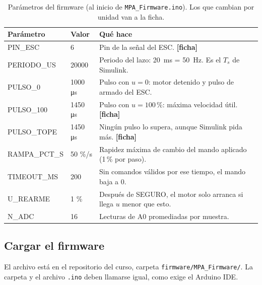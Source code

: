 \documentclass[11pt,letterpaper]{article}
\newcommand{\ficha}{\textcolor{verdeOK}{\textbf{[ficha]}}}  %
\begin{document}
\begin{table}[H]\centering\small
\caption{Parámetros del firmware (al inicio de \texttt{MPA\_Firmware.ino}). Los que cambian por unidad van a la ficha.}\label{tab:parametros}
\begin{tabularx}{\linewidth}{@{}>{\ttfamily}l l >{\raggedright\arraybackslash}X@{}}\toprule
\normalfont\textbf{Parámetro} & \textbf{Valor} & \textbf{Qué hace}\\\midrule
PIN\_ESC & 6 & Pin de la señal del ESC. \ficha\\
PERIODO\_US & 20000 & Periodo del lazo: \SI{20}{ms} = 50~Hz. Es el $T_s$ de Simulink.\\
PULSO\_0 & 1000 \si{\micro s} & Pulso con $u=0$: motor detenido y pulso de armado del ESC.\\
PULSO\_100 & 1450 \si{\micro s} & Pulso con $u=100\,\%$: máxima velocidad útil. \ficha\\
PULSO\_TOPE & 1450 \si{\micro s} & Ningún pulso lo supera, aunque Simulink pida más. \ficha\\
RAMPA\_PCT\_S & 50 \%/s & Rapidez máxima de cambio del mando aplicado (1\,\% por paso).\\
TIMEOUT\_MS & 200 & Sin comandos válidos por ese tiempo, el mando baja a 0.\\
U\_REARME & 1 \% & Después de SEGURO, el motor solo arranca si llega $u$ menor que esto.\\
N\_ADC & 16 & Lecturas de A0 promediadas por muestra.\\\bottomrule
\end{tabularx}
\end{table}

\subsection{Cargar el firmware}\label{sec:firmware}

El archivo está en el repositorio del curso, carpeta \texttt{firmware/MPA\_Firmware/}. La carpeta y el archivo \texttt{.ino} deben llamarse igual, como exige el Arduino IDE.
\end{document}
